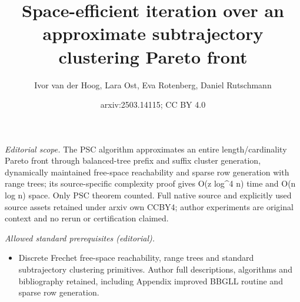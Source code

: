 \documentclass[11pt]{article}
\title{Space-efficient iteration over an approximate subtrajectory clustering Pareto front}
\author{Ivor van der Hoog, Lara Ost, Eva Rotenberg, Daniel Rutschmann}
\date{arxiv:2503.14115; CC BY 4.0}
\begin{document}
\maketitle
\noindent\textit{Editorial scope.} The PSC algorithm approximates an entire length/cardinality Pareto front through balanced-tree prefix and suffix cluster generation, dynamically maintained free-space reachability and sparse row generation with range trees; its source-specific complexity proof gives O(z log\textasciicircum{}4 n) time and O(n log n) space. Only PSC theorem counted. Full native source and explicitly used source assets retained under arxiv own CCBY4; author experiments are original context and no rerun or certification claimed.\par\medskip
\noindent\textit{Allowed standard prerequisites (editorial).}\begin{itemize}
\item Discrete Frechet free-space reachability, range trees and standard subtrajectory clustering primitives. Author full descriptions, algorithms and bibliography retained, including Appendix improved BBGLL routine and sparse row generation.
\end{itemize}\medskip
\end{document}
